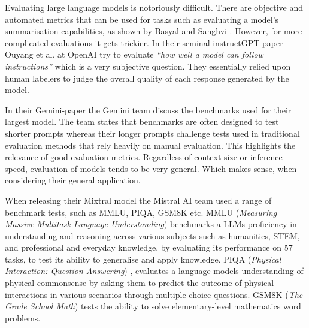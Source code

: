 
Evaluating large language models is notoriously difficult. There are objective and automated metrics that can be used for tasks such as evaluating a model's summarisation capabilities, as shown by Basyal and Sanghvi \cite{basyal_text_2023}. However, for more complicated evaluations it gets trickier. In their seminal instructGPT paper Ouyang et al. at OpenAI try to evaluate \textit{“how well a model can follow instructions”} \cite{ouyang_training_2022} which is a very subjective question. They essentially relied upon human labelers to judge the overall quality of each response generated by the model.

In their Gemini-paper the Gemini team discuss the benchmarks used for their largest model. The team states that benchmarks are often designed to test shorter prompts whereas their longer prompts challenge tests used in traditional evaluation methods that rely heavily on manual evaluation. This highlights the relevance of good evaluation metrics. Regardless of context size or inference speed, evaluation of models tends to be very general. Which makes sense, when considering their general application.

When releasing their Mixtral model \cite{jiang_mixtral_2024} the Mistral AI team used a range of benchmark tests, such as MMLU, PIQA, GSM8K etc. MMLU (\textit{Measuring Massive Multitask Language Understanding}) \cite{hendrycks_measuring_2021} benchmarks a LLMs proficiency in understanding and reasoning across various subjects such as humanities, STEM, and professional and everyday knowledge, by evaluating its performance on 57 tasks, to test its ability to generalise and apply knowledge. PIQA (\textit{Physical Interaction: Question Answering}) \cite{bisk_piqa_2019}, evaluates a language models understanding of physical commonsense by asking them to predict the outcome of physical interactions in various scenarios through multiple-choice questions. GSM8K (\textit{The Grade School Math}) \cite{cobbe_training_2021} tests the ability to solve elementary-level mathematics word problems.

